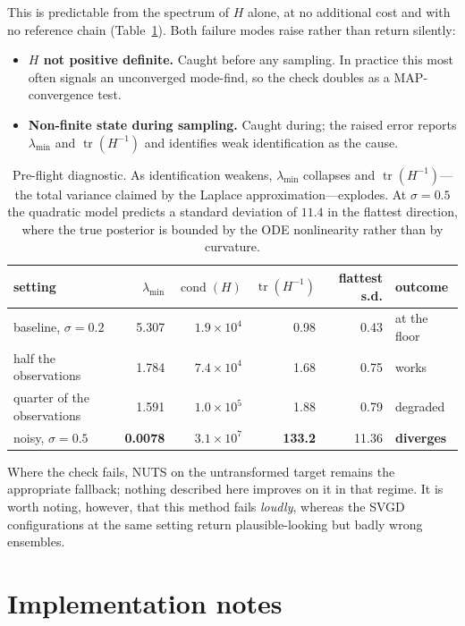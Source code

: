 \documentclass[11pt]{article}
\newcommand{\tr}{\operatorname{tr}}
\begin{document}
This is predictable from the spectrum of $H$ alone, at no additional cost and with no reference
chain (Table~\ref{tab:failure}). Both failure modes raise rather than return silently:

\begin{itemize}[leftmargin=1.3em,itemsep=2pt]
  \item \textbf{$H$ not positive definite.} Caught before any sampling. In practice this most
  often signals an unconverged mode-find, so the check doubles as a MAP-convergence test.
  \item \textbf{Non-finite state during sampling.} Caught during; the raised error reports
  $\lambda_{\min}$ and $\tr(H^{-1})$ and identifies weak identification as the cause.
\end{itemize}

\begin{table}[t]
\centering
\begin{tabular}{lrrrrl}
\toprule
setting & $\lambda_{\min}$ & $\operatorname{cond}(H)$ & $\tr(H^{-1})$ & flattest s.d. & outcome \\
\midrule
baseline, $\sigma=0.2$ & 5.307 & $1.9\times10^{4}$ & 0.98 & 0.43 & at the floor \\
half the observations & 1.784 & $7.4\times10^{4}$ & 1.68 & 0.75 & works \\
quarter of the observations & 1.591 & $1.0\times10^{5}$ & 1.88 & 0.79 & degraded \\
noisy, $\sigma=0.5$ & \textbf{0.0078} & $3.1\times10^{7}$ & \textbf{133.2} & 11.36 & \textbf{diverges} \\
\bottomrule
\end{tabular}
\caption{Pre-flight diagnostic. As identification weakens, $\lambda_{\min}$ collapses and
$\tr(H^{-1})$---the total variance claimed by the Laplace approximation---explodes. At
$\sigma=0.5$ the quadratic model predicts a standard deviation of $11.4$ in the flattest
direction, where the true posterior is bounded by the ODE nonlinearity rather than by curvature.}
\label{tab:failure}
\end{table}

Where the check fails, NUTS on the untransformed target remains the appropriate fallback; nothing
described here improves on it in that regime. It is worth noting, however, that this method fails
\emph{loudly}, whereas the SVGD configurations at the same setting return plausible-looking but
badly wrong ensembles.

\section{Implementation notes}
\end{document}
